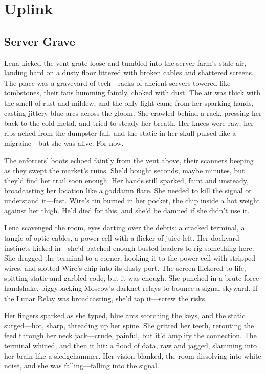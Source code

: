 \documentclass[12pt]{book}
\begin{document}
\chapter{Uplink}

\section{Server Grave}

Lena kicked the vent grate loose and tumbled into the server farm’s stale air, landing hard on a dusty floor littered with broken cables and shattered screens. The place was a graveyard of tech---racks of ancient servers towered like tombstones, their fans humming faintly, choked with dust. The air was thick with the smell of rust and mildew, and the only light came from her sparking hands, casting jittery blue arcs across the gloom. She crawled behind a rack, pressing her back to the cold metal, and tried to steady her breath. Her knees were raw, her ribs ached from the dumpster fall, and the static in her skull pulsed like a migraine---but she was alive. For now.

The enforcers’ boots echoed faintly from the vent above, their scanners beeping as they swept the market’s ruins. She’d bought seconds, maybe minutes, but they’d find her trail soon enough. Her hands still sparked, faint and unsteady, broadcasting her location like a goddamn flare. She needed to kill the signal or understand it---fast. Wire’s tin burned in her pocket, the chip inside a hot weight against her thigh. He’d died for this, and she’d be damned if she didn’t use it.

Lena scavenged the room, eyes darting over the debris: a cracked terminal, a tangle of optic cables, a power cell with a flicker of juice left. Her dockyard instincts kicked in---she’d patched enough busted loaders to rig something here. She dragged the terminal to a corner, hooking it to the power cell with stripped wires, and slotted Wire’s chip into its dusty port. The screen flickered to life, spitting static and garbled code, but it was enough. She punched in a brute-force handshake, piggybacking Moscow’s darknet relays to bounce a signal skyward. If the Lunar Relay was broadcasting, she’d tap it---screw the risks.

Her fingers sparked as she typed, blue arcs scorching the keys, and the static surged---hot, sharp, threading up her spine. She gritted her teeth, rerouting the feed through her neck jack---crude, painful, but it’d amplify the connection. The terminal whined, and then it hit: a flood of data, raw and jagged, slamming into her brain like a sledgehammer. Her vision blanked, the room dissolving into white noise, and she was falling---falling into the signal.
\end{document}
